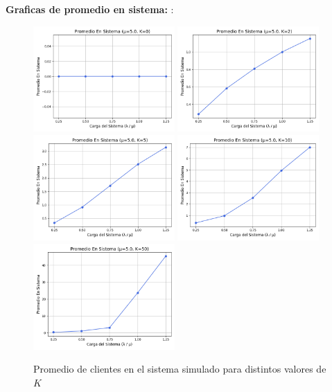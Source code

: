 \documentclass[12pt]{article}
\begin{document}
\textbf{Graficas de promedio en sistema: }:
\begin{figure}[H]
    \centering
    \includegraphics[width=0.48\textwidth]{graficas/mm1k/k_0/promedio_en_sistema.png}
    \includegraphics[width=0.48\textwidth]{graficas/mm1k/k_2/promedio_en_sistema.png}
    \includegraphics[width=0.48\textwidth]{graficas/mm1k/k_5/promedio_en_sistema.png}
    \includegraphics[width=0.48\textwidth]{graficas/mm1k/k_10/promedio_en_sistema.png}
    \includegraphics[width=0.48\textwidth]{graficas/mm1k/k_50/promedio_en_sistema.png}
    \caption{Promedio de clientes en el sistema simulado para distintos valores de \( K \)}
\end{figure}
\end{document}
